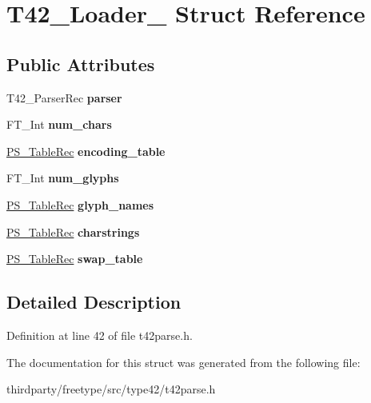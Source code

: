 \hypertarget{struct_t42___loader__}{}\section{T42\+\_\+\+Loader\+\_\+ Struct Reference}
\label{struct_t42___loader__}
\subsection*{Public Attributes}
\begin{DoxyCompactItemize}
\item 
\mbox{\label{struct_t42___loader___a7cbb8dec01fe34df610f485a8c7acdb2}} 
T42\+\_\+\+Parser\+Rec {\bfseries parser}
\item 
\mbox{\label{struct_t42___loader___a4081336233d57e0e2503b923855df27f}} 
F\+T\+\_\+\+Int {\bfseries num\+\_\+chars}
\item 
\mbox{\label{struct_t42___loader___a334e079aec27c48a96d39b3c9ba8f572}} 
\hyperlink{struct_p_s___table_rec__}{P\+S\+\_\+\+Table\+Rec} {\bfseries encoding\+\_\+table}
\item 
\mbox{\label{struct_t42___loader___af3f27a6420c89477ac605d7ad92c9da0}} 
F\+T\+\_\+\+Int {\bfseries num\+\_\+glyphs}
\item 
\mbox{\label{struct_t42___loader___a6e75eaf87cb8d0381b906669872926b3}} 
\hyperlink{struct_p_s___table_rec__}{P\+S\+\_\+\+Table\+Rec} {\bfseries glyph\+\_\+names}
\item 
\mbox{\label{struct_t42___loader___a950fab436437a128eda5cd5b0757962a}} 
\hyperlink{struct_p_s___table_rec__}{P\+S\+\_\+\+Table\+Rec} {\bfseries charstrings}
\item 
\mbox{\label{struct_t42___loader___ad4c14723ea9033b9e296482bfbc5d71e}} 
\hyperlink{struct_p_s___table_rec__}{P\+S\+\_\+\+Table\+Rec} {\bfseries swap\+\_\+table}
\end{DoxyCompactItemize}


\subsection{Detailed Description}


Definition at line 42 of file t42parse.\+h.



The documentation for this struct was generated from the following file\+:\begin{DoxyCompactItemize}
\item 
thirdparty/freetype/src/type42/t42parse.\+h\end{DoxyCompactItemize}
